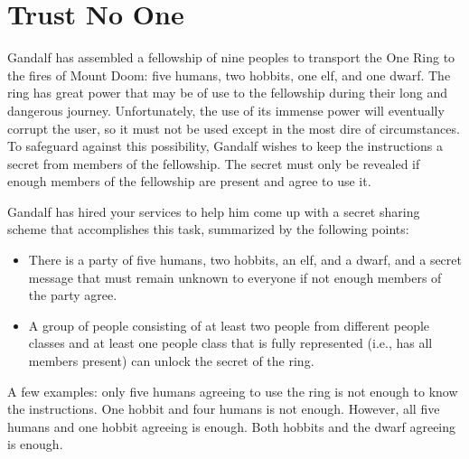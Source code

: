 \documentclass{article}
\begin{document}
\section{Trust No One}
\begin{hw}
	Gandalf has assembled a fellowship of nine peoples to transport the One Ring to the fires of Mount Doom: five humans, two hobbits, one elf, and one dwarf. The ring has great power that may be of use to the fellowship during their long and dangerous journey. Unfortunately, the use of its immense power will eventually corrupt the user, so it must not be used except in the most dire of circumstances. To safeguard against this possibility, Gandalf wishes to keep the instructions a secret from members of the fellowship. The secret must only be revealed if enough members of the fellowship are present and agree to use it.

Gandalf has hired your services to help him come up with a secret sharing scheme that accomplishes this task, summarized by the following points:
\begin{itemize}
	
	\item There is a party of five humans, two hobbits, an elf, and a dwarf, and a secret message that must remain unknown to everyone if not enough members of the party agree.
	\item A group of people consisting of at least two people from different people classes and at least one people class that is fully represented (i.e., has all members present) can unlock the secret of the ring.
	
\end{itemize}

A few examples: only five humans agreeing to use the ring is not enough to know the instructions. One hobbit and four humans is not enough. However, all five humans and one hobbit agreeing is enough. Both hobbits and the dwarf agreeing is enough.
\end{hw}
\end{document}
